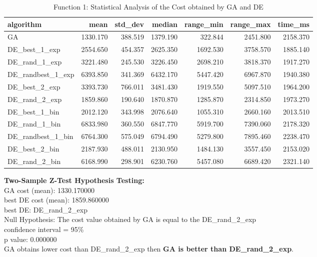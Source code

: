 \documentclass[12pt]{article}
\begin{document}
\begin{table}[H]
\centering
\footnotesize
\begin{tabular}{lrrrrrr}
	\toprule
	algorithm &     mean &  std\_dev &   median &  range\_min &  range\_max &  time\_ms \\
	\midrule
	GA & 1330.170 &  388.519 & 1379.190 &    322.844 &   2451.800 & 2158.370 \\
	DE\_best\_1\_exp & 2554.650 &  454.357 & 2625.350 &   1692.530 &   3758.570 & 1885.140 \\
	DE\_rand\_1\_exp & 3221.480 &  245.530 & 3226.450 &   2698.210 &   3818.370 & 1917.270 \\
	DE\_randbest\_1\_exp & 6393.850 &  341.369 & 6432.170 &   5447.420 &   6967.870 & 1940.380 \\
	DE\_best\_2\_exp & 3393.730 &  766.011 & 3481.430 &   1919.550 &   5097.510 & 1964.200 \\
	DE\_rand\_2\_exp & 1859.860 &  190.640 & 1870.870 &   1285.870 &   2314.850 & 1973.270 \\
	DE\_best\_1\_bin & 2012.120 &  343.998 & 2076.640 &   1055.310 &   2660.160 & 2013.510 \\
	DE\_rand\_1\_bin & 6833.980 &  360.550 & 6847.770 &   5919.700 &   7390.060 & 2178.320 \\
	DE\_randbest\_1\_bin & 6764.300 &  575.049 & 6794.490 &   5279.800 &   7895.460 & 2238.470 \\
	DE\_best\_2\_bin & 2187.930 &  488.011 & 2130.950 &   1484.130 &   3557.450 & 2153.020 \\
	DE\_rand\_2\_bin & 6168.990 &  298.901 & 6230.760 &   5457.080 &   6689.420 & 2321.140 \\
	\bottomrule
\end{tabular}
\caption{Function 1: Statistical Analysis of the Cost obtained by GA and DE} 
\end{table}

\noindent
\textbf{Two-Sample Z-Test Hypothesis Testing:}\\
GA cost (mean): 1330.170000\\
best DE cost (mean): 1859.860000\\
best DE: DE\_rand\_2\_exp\\
Null Hypothesis: The cost value obtained by GA is equal to the DE\_rand\_2\_exp\\
confidence interval = 95\%\\
p value: 0.000000\\
GA obtains lower cost than DE\_rand\_2\_exp then \textbf{GA is better than DE\_rand\_2\_exp}.\\
\end{document}
